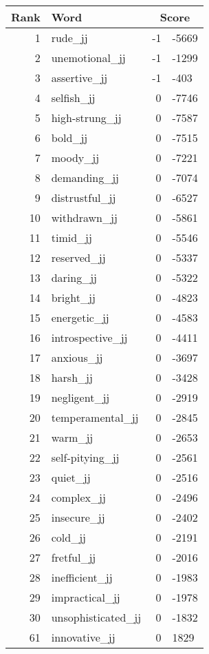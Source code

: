\begin{longtable}[!htbp]{| rlr@{.}l |}
    \hline
    \textbf{Rank} & \textbf{Word} & \multicolumn{2}{c|}{\textbf{Score}} \\
    \hline
    \endhead
    1 & rude\_jj & -1 & -5669 \\
    2 & unemotional\_jj & -1 & -1299 \\
    3 & assertive\_jj & -1 & -403 \\
    4 & selfish\_jj & 0 & -7746 \\
    5 & high-strung\_jj & 0 & -7587 \\
    6 & bold\_jj & 0 & -7515 \\
    7 & moody\_jj & 0 & -7221 \\
    8 & demanding\_jj & 0 & -7074 \\
    9 & distrustful\_jj & 0 & -6527 \\
    10 & withdrawn\_jj & 0 & -5861 \\
    11 & timid\_jj & 0 & -5546 \\
    12 & reserved\_jj & 0 & -5337 \\
    13 & daring\_jj & 0 & -5322 \\
    14 & bright\_jj & 0 & -4823 \\
    15 & energetic\_jj & 0 & -4583 \\
    16 & introspective\_jj & 0 & -4411 \\
    17 & anxious\_jj & 0 & -3697 \\
    18 & harsh\_jj & 0 & -3428 \\
    19 & negligent\_jj & 0 & -2919 \\
    20 & temperamental\_jj & 0 & -2845 \\
    21 & warm\_jj & 0 & -2653 \\
    22 & self-pitying\_jj & 0 & -2561 \\
    23 & quiet\_jj & 0 & -2516 \\
    24 & complex\_jj & 0 & -2496 \\
    25 & insecure\_jj & 0 & -2402 \\
    26 & cold\_jj & 0 & -2191 \\
    27 & fretful\_jj & 0 & -2016 \\
    28 & inefficient\_jj & 0 & -1983 \\
    29 & impractical\_jj & 0 & -1978 \\
    30 & unsophisticated\_jj & 0 & -1832 \\
    61 & innovative\_jj & 0 & 1829 \\

\end{longtable}
